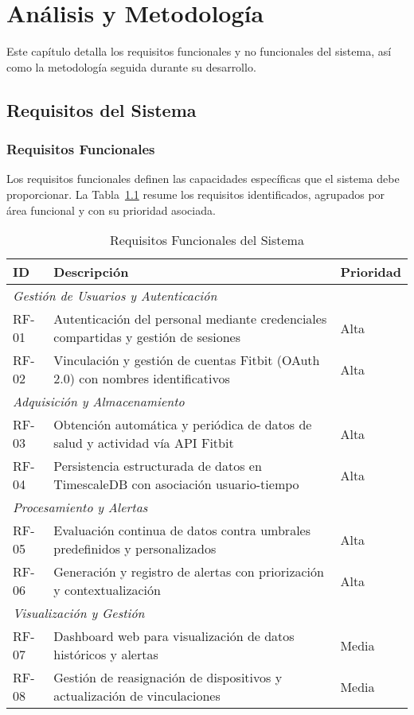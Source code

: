 \chapter{Análisis y Metodología}
\label{chap:requisitos_metodologia}

Este capítulo detalla los requisitos funcionales y no funcionales del sistema, así como la metodología seguida durante su desarrollo.

\section{Requisitos del Sistema}
\label{sec:requisitos}

\subsection{Requisitos Funcionales}
\label{subsec:requisitos_funcionales}

Los requisitos funcionales definen las capacidades específicas que el sistema debe proporcionar. La Tabla~\ref{tab:requisitos_funcionales} resume los requisitos identificados, agrupados por área funcional y con su prioridad asociada.

\begin{table}[htbp]
\caption{Requisitos Funcionales del Sistema}
\label{tab:requisitos_funcionales}
\begin{tabular}{|p{}|p{}|p{}|}
\hline
\textbf{ID} & \textbf{Descripción} & \textbf{Prioridad} \\
\hline
\multicolumn{3}{|l|}{\textit{Gestión de Usuarios y Autenticación}} \\
\hline
RF-01 & Autenticación del personal mediante credenciales compartidas y gestión de sesiones & Alta \\
RF-02 & Vinculación y gestión de cuentas Fitbit (OAuth 2.0) con nombres identificativos & Alta \\
\hline
\multicolumn{3}{|l|}{\textit{Adquisición y Almacenamiento}} \\
\hline
RF-03 & Obtención automática y periódica de datos de salud y actividad vía API Fitbit & Alta \\
RF-04 & Persistencia estructurada de datos en TimescaleDB con asociación usuario-tiempo & Alta \\
\hline
\multicolumn{3}{|l|}{\textit{Procesamiento y Alertas}} \\
\hline
RF-05 & Evaluación continua de datos contra umbrales predefinidos y personalizados & Alta \\
RF-06 & Generación y registro de alertas con priorización y contextualización & Alta \\
\hline
\multicolumn{3}{|l|}{\textit{Visualización y Gestión}} \\
\hline
RF-07 & Dashboard web para visualización de datos históricos y alertas & Media \\
RF-08 & Gestión de reasignación de dispositivos y actualización de vinculaciones & Media \\
\hline
\end{tabular}
\end{table}

